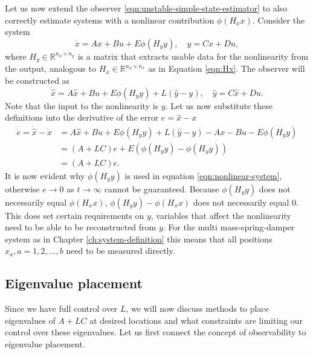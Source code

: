 Let us now extend the observer \eqref{eqn:unstable-simple-state-estimator} to also correctly estimate systems with a nonlinear contribution $\phi(H_xx)$. Consider the system
\begin{equation*}\label{eqn:nonlinear-system}
    \dot{x} = Ax + Bu + E\phi(H_yy), \quad y = Cx + Du,
\end{equation*}
where $H_y \in \mathbb{R}^{n_\phi \times n_y}$ is a matrix that extracts usable data for the nonlinearity from the output, analogous to $H_x \in \mathbb{R}^{n_\phi \times n_x}$ as in Equation \eqref{eqn:Hx}. The observer will be constructed as
\begin{equation}\label{eqn:nonlinear-single-observer}
    \dot{\hat{x}} = A\hat{x} + Bu + E\phi(H_yy) + L(\hat{y} - y), \quad \hat{y} = C\hat{x} + Du.
\end{equation}
Note that the input to the nonlinearity is $y$. Let us now substitute these definitions into the derivative of the error $e=\hat{x}-x$
\begin{equation*}\label{eqn:errror-nonlinear-observer}
    \begin{split}
        \dot{e} = \dot{\hat{x}} - \dot{x} &= A\hat{x} + Bu + E\phi(H_yy) + L(\hat{y} - y) - Ax - Bu - E\phi(H_yy) \\
        &= (A+LC)e + E(\phi(H_yy) - \phi(H_yy)) \\
        &= (A+LC)e.
    \end{split}
\end{equation*}
It is now evident why $\phi(H_yy)$ is used in equation \eqref{eqn:nonlinear-system}, otherwise $e \rightarrow 0$ as $t \rightarrow \infty$ cannot be guaranteed. Because $\phi(H_yy)$ does not necessarily equal $\phi(H_xx)$, $\phi(H_yy) - \phi(H_xx)$ does not necessarily equal $0$. This does set certain requirements on $y$, variables that affect the nonlinearity need to be able to be reconstructed from $y$. For the multi mass-spring-damper system as in Chapter \ref{ch:system-definition} this means that all positions $x_a,a=1,2,\dots,b$ need to be measured directly. 

\subsection{Eigenvalue placement}
Since we have full control over $L$, we will now discuss methods to place eigenvalues of $A+LC$ at desired locations and what constraints are limiting our control over these eigenvalues. Let us first connect the concept of observability to eigenvalue placement.

